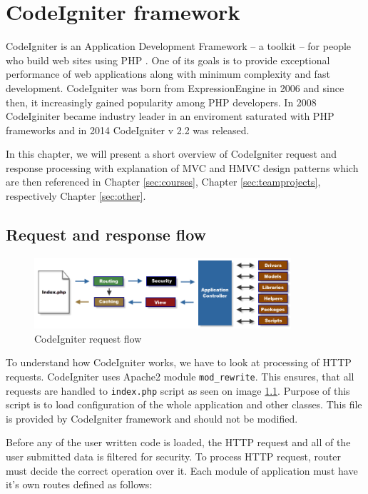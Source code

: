 \chapter{CodeIgniter framework}

CodeIgniter is an Application Development Framework -- a toolkit -- for people who build web sites using PHP  \cite{codeigniter}. One of its goals is to provide exceptional performance of web applications along with minimum complexity and fast development. CodeIgniter was born from ExpressionEngine \cite{codeigniter} in 2006 and since then, it increasingly gained popularity among PHP developers. In 2008 CodeIginiter became industry leader in an enviroment saturated with PHP frameworks \cite{codeigniter} and in 2014 CodeIgniter v 2.2 was released. 

In this chapter, we will present a short overview of CodeIgniter request and response processing with explanation of MVC and HMVC design patterns which are then referenced in Chapter \ref{sec:courses}, Chapter \ref{sec:teamprojects}, respectively Chapter \ref{sec:other}.

\section{Request and response flow}

\begin{figure}[h]
    \centering
    \includegraphics[width=0.85\textwidth]{images/codeigniter.png}
    \caption{CodeIgniter request flow}
    \label{codeigniter_flow}
\end{figure}


To understand how CodeIgniter works, we have to look at processing of HTTP requests. CodeIgniter uses Apache2  module \texttt{mod\_rewrite}. This ensures, that all requests are handled to \texttt{index.php} script as seen on image \ref{codeigniter_flow}. Purpose of this script is to load configuration of the whole application and other classes. This file is provided by CodeIgniter framework and should not be modified.

Before any of the user written code is loaded, the HTTP request and all of the user submitted data is filtered for security. To process HTTP request, router must decide the correct operation over it. Each module of application must have it's own routes defined as follows:

